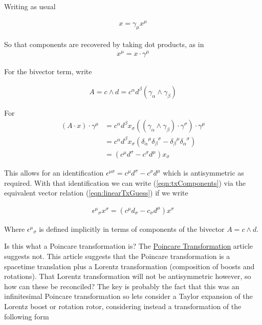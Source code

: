 Writing as usual

\begin{align*}
x = \gamma_\mu x^\mu
\end{align*}

So that components are recovered by taking dot products, as in
\begin{align*}
x^\mu = x \cdot \gamma^\mu
\end{align*}

For the bivector term, write

\begin{align*}
A = c \wedge d = c^\alpha d^\beta (\gamma_\alpha \wedge \gamma_\beta)
\end{align*}

For
\begin{align*}
(A \cdot x ) \cdot \gamma^\mu 
&=
c^\alpha d^\beta x_\sigma ((\gamma_\alpha \wedge \gamma_\beta) \cdot \gamma^\sigma) \cdot \gamma^\mu \\
&=
c^\alpha d^\beta x_\sigma ( {\delta_\alpha}^\mu {\delta_\beta}^\sigma -{\delta_\beta}^\mu {\delta_\alpha}^\sigma ) \\
&=
(c^\mu d^\sigma -c^\sigma d^\mu ) x_\sigma 
\end{align*}

This allows for an identification $\epsilon^{\mu\sigma} = c^\mu d^\sigma -c^\sigma d^\mu$ which is antisymmetric as required.  With that identification we can write (\ref{eqn:txComponents}) via the equivalent vector relation (\ref{eqn:linearTxGuess}) if we write

\begin{align*}
{\epsilon^\mu}_\sigma x^\sigma = (c^\mu d_\sigma -c_\sigma d^\mu ) x^\sigma 
\end{align*}

Where ${\epsilon^\mu}_\sigma$ is defined implicitly in terms of components of the bivector $A = c \wedge d$.

Is this what a Poincare transformation is?  The \href{http://mathworld.wolfram.com/PoincareTransformation.html}{Poincare Transformation} article suggests not.  This article suggests that the Poincare transformation is a spacetime translation plus a Lorentz transformation (composition of boosts and rotations).  That Lorentz transformation will not be antisymmetric however, so how can these be reconciled?  The key is probably the fact that this was an infinitesimal Poincare transformation so lets consider a Taylor expansion of the Lorentz boost or rotation rotor, considering instead a transformation of the following form

